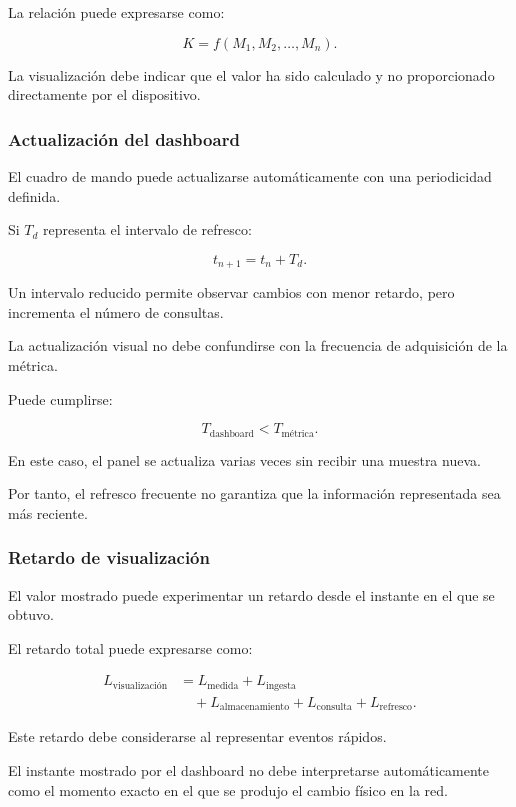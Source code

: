 La relación puede expresarse como:

\[
    K
    =
    f
    \left(
        M_1,
        M_2,
        \ldots,
        M_n
    \right).
\]

La visualización debe indicar que el valor ha sido calculado y no
proporcionado directamente por el dispositivo.


\subsubsection*{Actualización del dashboard}

El cuadro de mando puede actualizarse automáticamente con una
periodicidad definida.

Si \(T_d\) representa el intervalo de refresco:

\[
    t_{n+1}
    =
    t_n
    +
    T_d.
\]

Un intervalo reducido permite observar cambios con menor retardo, pero
incrementa el número de consultas.

La actualización visual no debe confundirse con la frecuencia de
adquisición de la métrica.

Puede cumplirse:

\[
    T_{\mathrm{dashboard}}
    <
    T_{\mathrm{métrica}}.
\]

En este caso, el panel se actualiza varias veces sin recibir una muestra
nueva.

Por tanto, el refresco frecuente no garantiza que la información
representada sea más reciente.


\subsubsection*{Retardo de visualización}

El valor mostrado puede experimentar un retardo desde el instante en el
que se obtuvo.

El retardo total puede expresarse como:

\[
\begin{aligned}
    L_{\mathrm{visualización}}
    &=
    L_{\mathrm{medida}}
    +
    L_{\mathrm{ingesta}}\\
    &\quad+
    L_{\mathrm{almacenamiento}}
    +
    L_{\mathrm{consulta}}
    +
    L_{\mathrm{refresco}}.
\end{aligned}
\]

Este retardo debe considerarse al representar eventos rápidos.

El instante mostrado por el dashboard no debe interpretarse
automáticamente como el momento exacto en el que se produjo el cambio
físico en la red.


